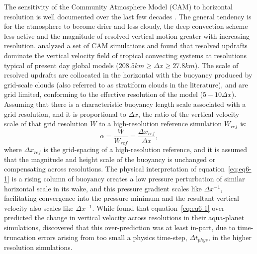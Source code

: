 The sensitivity of the Community Atmosphere Model (CAM) to horizontal resolution is well documented over the last few decades \citep{KW1991JGR,WETAL1995CD,W1999T,W2008TELLUS,LETAL2011TELLUS,RJ2011MWR,RETAL2012ASL,OETAL2013JCLIM,RETAL2013JCLIM,ZetAl2014JCb,LETAL2015JCLIM}. The general tendency is for the atmosphere to become drier and less cloudy, the deep convection scheme less active and the magnitude of resolved vertical motion greater with increasing resolution. \cite{HR2017JCLIM,HR2018JAMES} analyzed a set of CAM simulations and found that resolved updrafts dominate the vertical velocity field of tropical convecting systems at resolutions typical of present day global models ($208.5 km \geq \Delta x \geq 27.8 km$). The scale of resolved updrafts are collocated in the horizontal with the buoyancy produced by grid-scale clouds (also referred to as stratiform clouds in the literature), and are grid limited, conforming to the effective resolution of the model ($5-10\Delta x$). Assuming that there is a characteristic buoyancy length scale associated with a grid resolution, and it is proportional to $\Delta x$, the ratio of the vertical velocity scale of that grid resolution $W$ to a high-resolution reference simulation $W_{ref}$ is:
\begin{equation}
\alpha = \frac{W}{W_{ref}} = \frac{\Delta x_{ref}}{\Delta x} , \label{eq:eq6-1}
\end{equation}
where $\Delta x_{ref}$ is the grid-spacing of a high-resolution reference, and it is assumed that the magnitude and height scale of the buoyancy is unchanged or compensating across resolutions. The physical interpretation of equation~\ref{eq:eq6-1} is a rising column of buoyancy creates a low pressure perturbation of similar horizontal scale in its wake, and this pressure gradient scales like $\Delta x^{-1}$, facilitating convergence into the pressure minimum and the resultant vertical velocity also scales like $\Delta x^{-1}$. While \cite{HR2017JCLIM} found that equation~\ref{eq:eq6-1} over-predicted the change in vertical velocity across resolutions in their aqua-planet simulations, \cite{HR2017JCLIM} discovered that this over-prediction was at least in-part, due to time-truncation errors arising from too small a physics time-step, $\Delta t_{phys}$, in the higher resolution simulations.

